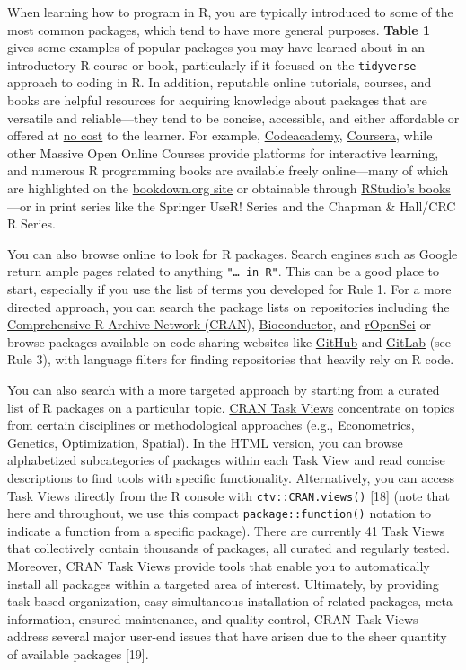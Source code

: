 \documentclass[10pt,letterpaper]{article}
\begin{document}
When learning how to program in R, you are typically introduced to some
of the most common packages, which tend to have more general purposes.
\textbf{Table 1} gives some examples of popular packages you may have
learned about in an introductory R course or book, particularly if it
focused on the \texttt{tidyverse} approach to coding in R. In addition,
reputable online tutorials, courses, and books are helpful resources for
acquiring knowledge about packages that are versatile and
reliable---they tend to be concise, accessible, and either affordable or
offered at \href{https://committedtotape.shinyapps.io/freeR/}{no cost}
to the learner. For example,
\href{https://www.codecademy.com/learn/learn-r}{Codeacademy},
\href{https://www.coursera.org/learn/r-programming}{Coursera}, while
other Massive Open Online Courses provide platforms for interactive
learning, and numerous R programming books are available freely
online---many of which are highlighted on the
\href{https://bookdown.org/}{bookdown.org site} or obtainable through
\href{https://rstudio.com/resources/books/}{RStudio's books}---or in
print series like the Springer UseR! Series and the Chapman \& Hall/CRC
R Series.

You can also browse online to look for R packages. Search engines such
as Google return ample pages related to anything
\texttt{"\ldots{}\ in\ R"}. This can be a good place to start,
especially if you use the list of terms you developed for Rule 1. For a
more directed approach, you can search the package lists on repositories
including the \href{https://cran.r-project.org/}{Comprehensive R Archive
Network (CRAN)}, \href{https://www.bioconductor.org/}{Bioconductor}, and
\href{https://ropensci.org/}{rOpenSci} or browse packages available on
code-sharing websites like \href{https://github.com/}{GitHub} and
\href{https://about.gitlab.com/}{GitLab} (see Rule 3), with language
filters for finding repositories that heavily rely on R code.

You can also search with a more targeted approach by starting from a
curated list of R packages on a particular topic.
\href{https://cran.r-project.org/web/views/}{CRAN Task Views}
concentrate on topics from certain disciplines or methodological
approaches (e.g., Econometrics, Genetics, Optimization, Spatial). In the
HTML version, you can browse alphabetized subcategories of packages
within each Task View and read concise descriptions to find tools with
specific functionality. Alternatively, you can access Task Views
directly from the R console with \texttt{ctv::CRAN.views()} {[}18{]}
(note that here and throughout, we use this compact
\texttt{package::function()} notation to indicate a function from a
specific package). There are currently 41 Task Views that collectively
contain thousands of packages, all curated and regularly tested.
Moreover, CRAN Task Views provide tools that enable you to automatically
install all packages within a targeted area of interest. Ultimately, by
providing task-based organization, easy simultaneous installation of
related packages, meta-information, ensured maintenance, and quality
control, CRAN Task Views address several major user-end issues that have
arisen due to the sheer quantity of available packages {[}19{]}.
\end{document}
